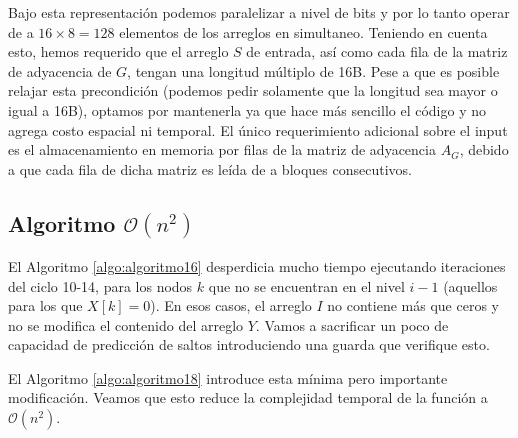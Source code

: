 Bajo esta representación podemos paralelizar a nivel de bits y por lo tanto operar de a $16 \times 8 = 128$ elementos de los arreglos en simultaneo. Teniendo en cuenta esto, hemos requerido que el arreglo $S$ de entrada, así como cada fila de la matriz de adyacencia de $G$, tengan una longitud múltiplo de 16B. Pese a que es posible relajar esta precondición (podemos pedir solamente que la longitud sea mayor o igual a 16B), optamos por mantenerla ya que hace más sencillo el código y no agrega costo espacial ni temporal. El único requerimiento adicional sobre el input es el almacenamiento en memoria por filas de la matriz de adyacencia $A_G$, debido a que cada fila de dicha matriz es leída de a bloques consecutivos.

\subsection{Algoritmo $\mathcal{O}(n^2)$}

El Algoritmo \ref{algo:algoritmo16} desperdicia mucho tiempo ejecutando iteraciones del ciclo 10-14, para los nodos $k$ que no se encuentran en el nivel $i - 1$ (aquellos para los que $X[k] = 0$). En esos casos, el arreglo $I$ no contiene más que ceros y no se modifica el contenido del arreglo $Y$. Vamos a sacrificar un poco de capacidad de predicción de saltos introduciendo una guarda que verifique esto.

\begin{algorithm}
	\dontprintsemicolon
 	\BlankLine
\caption{$\textsc{Vectorized-BFS-Branching}$}
\label{algo:algoritmo18}
\end{algorithm}

El Algoritmo \ref{algo:algoritmo18} introduce esta mínima pero importante modificación. Veamos que esto reduce la complejidad temporal de la función a $\mathcal{O}(n^2)$.

